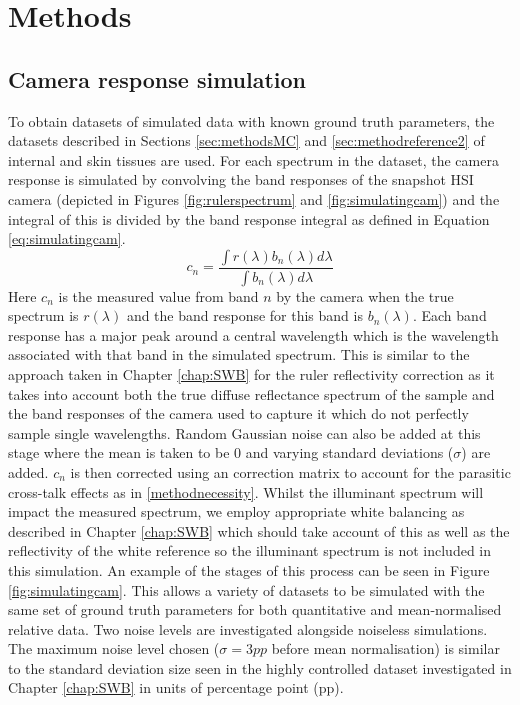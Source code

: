 \section{Methods}
\subsection{Camera response simulation}\label{sec:MCcameras}
To obtain datasets of simulated data with known ground truth parameters, the datasets described in Sections \ref{sec:methodsMC} and \ref{sec:methodreference2} of internal and skin tissues are used. For each spectrum in the dataset, the camera response is simulated by convolving the band responses of the snapshot HSI camera (depicted in Figures \ref{fig:rulerspectrum} and \ref{fig:simulatingcam}) and the integral of this is divided by the band response integral as defined in Equation \eqref{eq:simulatingcam}. 
\begin{equation}
	c_{n} = \frac{\int r(\lambda)b_n(\lambda) d\lambda}{\int b_n(\lambda) d\lambda}
\label{eq:simulatingcam}
\end{equation}
Here $c_n$ is the measured value from band $n$ by the camera when the true spectrum is $r(\lambda)$ and the band response for this band is $b_n(\lambda)$. Each band response has a major peak around a central wavelength which is the wavelength associated with that band in the simulated spectrum. This is similar to the approach taken in Chapter \ref{chap:SWB} for the ruler reflectivity correction as it takes into account both the true diffuse reflectance spectrum of the sample and the band responses of the camera used to capture it which do not perfectly sample single wavelengths. Random Gaussian noise can also be added at this stage where the mean is taken to be 0 and varying standard deviations ($\sigma$) are added. $c_n$ is then corrected using an correction matrix to account for the parasitic cross-talk effects as in \ref{methodnecessity}. Whilst the illuminant spectrum will impact the measured spectrum, we employ appropriate white balancing as described in Chapter \ref{chap:SWB} which should take account of this as well as the reflectivity of the white reference so the illuminant spectrum is not included in this simulation. An example of the stages of this process can be seen in Figure \ref{fig:simulatingcam}. This allows a variety of datasets to be simulated with the same set of ground truth parameters for both quantitative and mean-normalised relative data. Two noise levels are investigated alongside noiseless simulations. The maximum noise level chosen ($\sigma = 3pp$ before mean normalisation) is similar to the standard deviation size seen in the highly controlled dataset investigated in Chapter \ref{chap:SWB} in units of percentage point (pp).  
